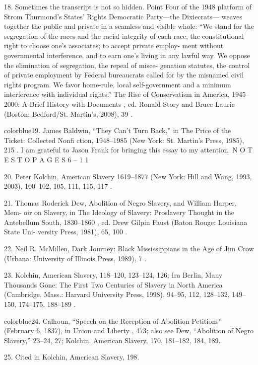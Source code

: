 	{\color{blue}18}. Sometimes the transcript is not so hidden. Point Four of the 1948 platform of Strom Thurmond’s States’ Rights Democratic Party—the Dixiecrats— weaves together the public and private in a seamless and visible whole: “We stand for the segregation of the races and the racial integrity of each race; the constitutional right to choose one’s associates; to accept private employ- ment without governmental interference, and to earn one’s living in any lawful way. We oppose the elimination of segregation, the repeal of misce- genation statutes, the control of private employment by Federal bureaucrats called for by the misnamed civil rights program. We favor home-rule, local self-government and a minimum interference with individual rights.” The Rise of Conservatism in America, 1945–2000: A Brief History with Documents , ed. Ronald Story and Bruce Laurie (Boston: Bedford/St. Martin’s, 2008), 39 .


	{color{blue}19}. James Baldwin, “They Can’t Turn Back,” in The Price of the Ticket: Collected Nonfi ction, 1948–1985 (New York: St. Martin’s Press, 1985), 215 . I am grateful to Jason Frank for bringing this essay to my attention. N O T E S T O P A G E S 6 – 1 1


	{\color{blue}20}. Peter Kolchin, American Slavery 1619–1877 (New York: Hill and Wang, 1993, 2003), 100–102, 105, 111, 115, 117 .


	{\color{blue}21}. Thomas Roderick Dew, Abolition of Negro Slavery, and William Harper, Mem- oir on Slavery, in The Ideology of Slavery: Proslavery Thought in the Antebellum South, 1830–1860 , ed. Drew Gilpin Faust (Baton Rouge: Louisiana State Uni- versity Press, 1981), 65, 100 .


	{\color{blue}22}. Neil R. McMillen, Dark Journey: Black Mississippians in the Age of Jim Crow (Urbana: University of Illinois Press, 1989), 7 .


	{\color{blue}23}. Kolchin, American Slavery, 118–120, 123–124, 126; Ira Berlin, Many Thousands Gone: The First Two Centuries of Slavery in North America (Cambridge, Mass.: Harvard University Press, 1998), 94–95, 112, 128–132, 149–150, 174–175, 188–189 .


	{color{blue}24}. Calhoun, “Speech on the Reception of Abolition Petitions” (February 6, 1837), in Union and Liberty , 473; also see Dew, “Abolition of Negro Slavery,” 23–24, 27; Kolchin, American Slavery, 170, 181–182, 184, 189.


	{\color{blue}25}. Cited in Kolchin, American Slavery, 198.


